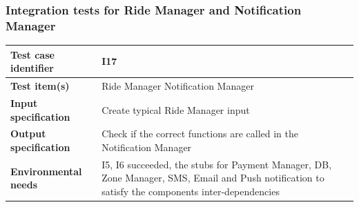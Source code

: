 \documentclass[a4paper,11pt]{report} %
\begin{document}
		\subsubsection{Integration tests for Ride Manager and Notification Manager} \label{sec:3.1.14}
			\begin{minipage}{\linewidth}
			\end{minipage}		
		\begin{center}
			\renewcommand{\arraystretch}{1.2}
			\setlength{\tabcolsep}{24pt}
			\begin{tabular}{ l  p{9cm}}\hline
				\textbf{Test case identifier} & I17\\\hline
				\textbf{Test item(s)} & Ride Manager \textrightarrow Notification Manager\\\hline
				\textbf{Input specification} & Create typical Ride Manager input \\\hline
				\textbf{Output specification} & Check if the correct functions are called in the Notification Manager\\\hline
				\textbf{Environmental needs} & I5, I6 succeeded, the stubs for Payment Manager, DB, Zone Manager, SMS, Email and Push notification to satisfy the components inter-dependencies\\\hline
			\end{tabular}
		\end{center}
		
		\bigskip
\end{document}
